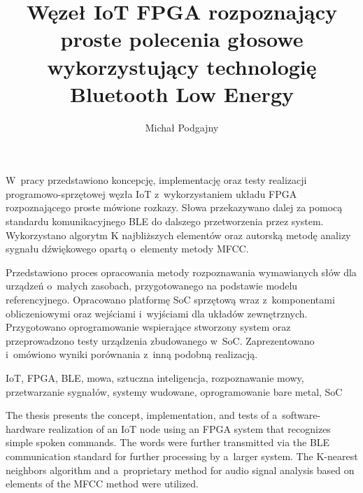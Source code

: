 \documentclass[
    left=2.5cm,         %
    right=2.5cm,        %
    top=2.5cm,          %
    bottom=3cm,         %
    bindingoffset=6mm,  %
    nohyphenation=true %
]{eiti/eiti-thesis} %
\begin{document}
\EngineerThesis
{}
\title{
	Węzeł IoT FPGA rozpoznający proste polecenia głosowe\\
	wykorzystujący technologię Bluetooth Low Energy
}
\author{Michał Podgajny}
\date{\the\year}
\maketitle

\newpage
\streszczenie W~pracy przedstawiono koncepcję, implementację oraz testy realizacji programowo-sprzętowej węzła IoT z~wykorzystaniem układu FPGA rozpoznającego proste mówione rozkazy. Słowa przekazywano dalej za pomocą standardu komunikacyjnego BLE do dalszego przetworzenia przez system. Wykorzystano algorytm K najbliższych elementów oraz autorską metodę analizy sygnału dźwiękowego opartą o~elementy metody MFCC.

Przedstawiono proces opracowania metody rozpoznawania wymawianych słów dla urządzeń o~małych zasobach, przygotowanego na podstawie modelu referencyjnego. Opracowano platformę SoC sprzętową wraz z~komponentami obliczeniowymi oraz wejściami i~wyjściami dla układów zewnętrznych. Przygotowano oprogramowanie wspierające stworzony system oraz przeprowadzono testy urządzenia zbudowanego w~SoC. Zaprezentowano i~omówiono wyniki porównania z~inną podobną realizacją.

\slowakluczowe IoT, FPGA, BLE, mowa, sztuczna inteligencja, rozpoznawanie mowy, przetwarzanie sygnałów, systemy wudowane, oprogramowanie bare metal, SoC

\newpage

\abstract 
The thesis presents the concept, implementation, and tests of a~software-hardware realization of an IoT node using an FPGA system that recognizes simple spoken commands. The words were further transmitted via the BLE communication standard for further processing by a~larger system. The K-nearest neighbors algorithm and a~proprietary method for audio signal analysis based on elements of the MFCC method were utilized.
\end{document}
